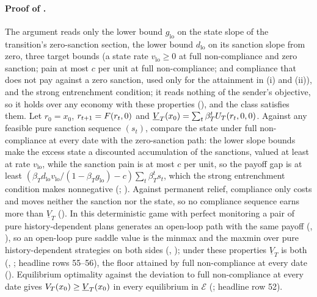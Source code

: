 \paragraph{Proof of .}
The argument reads only the lower bound $g_{\mathrm{lo}}$ on the state slope of the
transition's zero-sanction section, the lower bound $d_{\mathrm{lo}}$ on its sanction slope
from zero, three target bounds
(a state rate $v_{\mathrm{lo}}\ge0$ at full non-compliance and zero sanction; pain at
most $c$ per unit at full non-compliance; and compliance that does not pay against a
zero sanction, used only for the attainment in (i) and (ii)), and the
strong entrenchment condition; it reads nothing of the sender's objective, so it holds over any
economy with these properties (),
and the class satisfies them. Let $r_0=x_0$, $r_{t+1}=F(r_t,0)$ and
$\underline V_T(x_0)=\sum_t\beta_T^tU_T(r_t,0,0)$. Against any feasible pure sanction sequence
$(s_t)$, compare the state under full non-compliance at every date with the zero-sanction path: the
lower slope bounds make the excess state a discounted accumulation of the sanctions,
valued at least at rate $v_{\mathrm{lo}}$, while the sanction pain is at most $c$
per unit, so the payoff gap is at least
$(\beta_Td_{\mathrm{lo}}v_{\mathrm{lo}}/(1-\beta_Tg_{\mathrm{lo}})-c)\sum_t\beta_T^ts_t$,
which the strong entrenchment condition makes nonnegative
(; ).
Against permanent relief, compliance only costs and moves neither the sanction
nor the state, so no compliance sequence earns more than $\underline V_T$
(). In this deterministic game with perfect
monitoring a pair of pure history-dependent plans generates an open-loop path
with the same payoff (,
), so an open-loop pure saddle value is the
minmax and the maxmin over pure history-dependent strategies on both sides
(,
); under these properties $\underline V_T$ is
both (, ;
headline rows 55--56), the floor attained by full non-compliance at every date
(). Equilibrium optimality against
the deviation to full non-compliance at every date gives $V_T(x_0)\ge\underline V_T(x_0)$ in every
equilibrium in $\mathcal E$ (; headline row 52).

